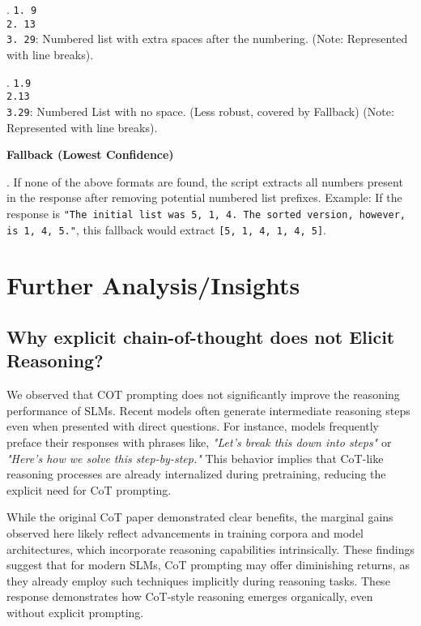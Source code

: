 . \texttt{1.  9\\2.  13\\3. 29}: Numbered list with extra spaces after the numbering. (Note: Represented with line breaks).

. \texttt{1.9\\2.13\\3.29}: Numbered List with no space. (Less robust, covered by Fallback) (Note: Represented with line breaks).
\vspace{0.5em}

\noindent \textbf{Fallback (Lowest Confidence)}
\vspace{0.2em}

. If none of the above formats are found, the script extracts all numbers present in the response after removing potential numbered list prefixes. Example: If the response is \texttt{"The initial list was 5, 1, 4. The sorted version, however, is 1, 4, 5."}, this fallback would extract \texttt{[5, 1, 4, 1, 4, 5]}.





\newpage


\section{Further Analysis/Insights}
\subsection{Why explicit chain-of-thought does not Elicit Reasoning?}
\label{app: Why explicit chain-of-thought does not Elicit Reasoning?}
We observed that COT prompting does not significantly improve the reasoning performance of SLMs. Recent models often generate intermediate reasoning steps even when presented with direct questions. For instance, models frequently preface their responses with phrases like, \textit{"Let’s break this down into steps"} or \textit{"Here’s how we solve this step-by-step."} This behavior implies that CoT-like reasoning processes are already internalized during pretraining, reducing the explicit need for CoT prompting.\medskip

While the original CoT paper demonstrated clear benefits, the marginal gains observed here likely reflect advancements in training corpora and model architectures, which incorporate reasoning capabilities intrinsically. These findings suggest that for modern SLMs, CoT prompting may offer diminishing returns, as they already employ such techniques implicitly during reasoning tasks. These response demonstrates how CoT-style reasoning emerges organically, even without explicit prompting.

